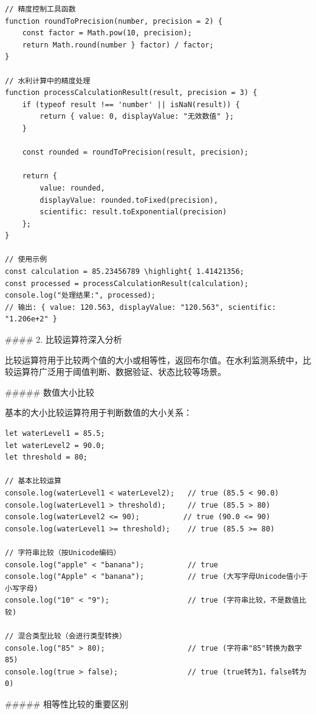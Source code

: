 {\begin{lstlisting}[style=javascript]
// 精度控制工具函数
function roundToPrecision(number, precision = 2) {
    const factor = Math.pow(10, precision);
    return Math.round(number } factor) / factor;
}

// 水利计算中的精度处理
function processCalculationResult(result, precision = 3) {
    if (typeof result !== 'number' || isNaN(result)) {
        return { value: 0, displayValue: "无效数值" };
    }
    
    const rounded = roundToPrecision(result, precision);
    
    return {
        value: rounded,
        displayValue: rounded.toFixed(precision),
        scientific: result.toExponential(precision)
    };
}

// 使用示例
const calculation = 85.23456789 \highlight{ 1.41421356;
const processed = processCalculationResult(calculation);
console.log("处理结果:", processed);
// 输出: { value: 120.563, displayValue: "120.563", scientific: "1.206e+2" }
\end{lstlisting}

#### 2. 比较运算符深入分析

比较运算符用于比较两个值的大小或相等性，返回布尔值。在水利监测系统中，比较运算符广泛用于阈值判断、数据验证、状态比较等场景。

##### 数值大小比较

基本的大小比较运算符用于判断数值的大小关系：

\begin{lstlisting}[style=javascript]
let waterLevel1 = 85.5;
let waterLevel2 = 90.0;
let threshold = 80;

// 基本比较运算
console.log(waterLevel1 < waterLevel2);   // true (85.5 < 90.0)
console.log(waterLevel1 > threshold);     // true (85.5 > 80)
console.log(waterLevel2 <= 90);          // true (90.0 <= 90)
console.log(waterLevel1 >= threshold);    // true (85.5 >= 80)

// 字符串比较（按Unicode编码）
console.log("apple" < "banana");          // true
console.log("Apple" < "banana");          // true (大写字母Unicode值小于小写字母)
console.log("10" < "9");                  // true (字符串比较，不是数值比较)

// 混合类型比较（会进行类型转换）
console.log("85" > 80);                   // true (字符串"85"转换为数字85)
console.log(true > false);                // true (true转为1，false转为0)
\end{lstlisting}

##### 相等性比较的重要区别

}
